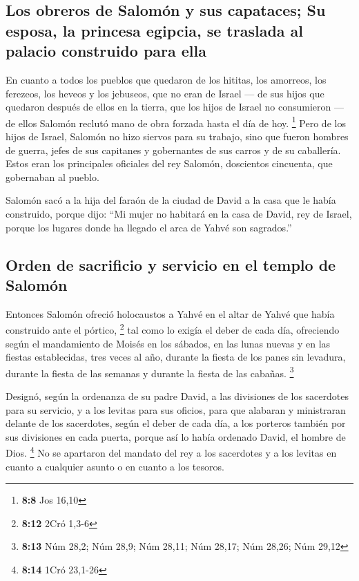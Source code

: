 \hypertarget{los-obreros-de-salomuxf3n-y-sus-capataces-su-esposa-la-princesa-egipcia-se-traslada-al-palacio-construido-para-ella}{%
\subsection{Los obreros de Salomón y sus capataces; Su esposa, la
princesa egipcia, se traslada al palacio construido para
ella}\label{los-obreros-de-salomuxf3n-y-sus-capataces-su-esposa-la-princesa-egipcia-se-traslada-al-palacio-construido-para-ella}}

 En cuanto a todos los pueblos que quedaron de los
hititas, los amorreos, los ferezeos, los heveos y los jebuseos, que no
eran de Israel ---  de sus hijos que quedaron después de
ellos en la tierra, que los hijos de Israel no consumieron --- de ellos
Salomón reclutó mano de obra forzada hasta el día de hoy. \footnote{\textbf{8:8}
  Jos 16,10}  Pero de los hijos de Israel, Salomón no hizo
siervos para su trabajo, sino que fueron hombres de guerra, jefes de sus
capitanes y gobernantes de sus carros y de su caballería.
 Estos eran los principales oficiales del rey Salomón,
doscientos cincuenta, que gobernaban al pueblo.

 Salomón sacó a la hija del faraón de la ciudad de David
a la casa que le había construido, porque dijo: ``Mi mujer no habitará
en la casa de David, rey de Israel, porque los lugares donde ha llegado
el arca de Yahvé son sagrados.''

\hypertarget{orden-de-sacrificio-y-servicio-en-el-templo-de-salomuxf3n}{%
\subsection{Orden de sacrificio y servicio en el templo de
Salomón}\label{orden-de-sacrificio-y-servicio-en-el-templo-de-salomuxf3n}}

 Entonces Salomón ofreció holocaustos a Yahvé en el altar
de Yahvé que había construido ante el pórtico, \footnote{\textbf{8:12}
  2Cró 1,3-6}  tal como lo exigía el deber de cada día,
ofreciendo según el mandamiento de Moisés en los sábados, en las lunas
nuevas y en las fiestas establecidas, tres veces al año, durante la
fiesta de los panes sin levadura, durante la fiesta de las semanas y
durante la fiesta de las cabañas. \footnote{\textbf{8:13} Núm 28,2; Núm
  28,9; Núm 28,11; Núm 28,17; Núm 28,26; Núm 29,12}

 Designó, según la ordenanza de su padre David, a las
divisiones de los sacerdotes para su servicio, y a los levitas para sus
oficios, para que alabaran y ministraran delante de los sacerdotes,
según el deber de cada día, a los porteros también por sus divisiones en
cada puerta, porque así lo había ordenado David, el hombre de Dios.
\footnote{\textbf{8:14} 1Cró 23,1-26}  No se apartaron
del mandato del rey a los sacerdotes y a los levitas en cuanto a
cualquier asunto o en cuanto a los tesoros.

